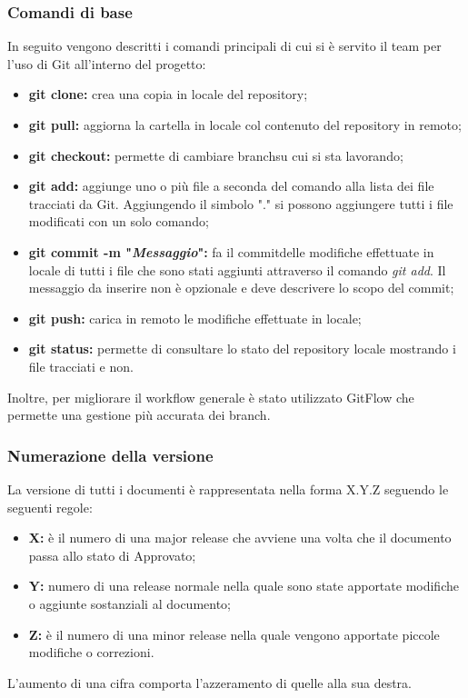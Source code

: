 		\subsubsection{Comandi di base}
			In seguito vengono descritti i comandi principali di cui si è servito il team per l'uso di Git all'interno del progetto:
			\begin{itemize}
				\item \textbf{git clone:} crea una copia in locale del repository\pedice;
				\item \textbf{git pull:} aggiorna la cartella in locale col contenuto del repository in remoto;
				\item \textbf{git checkout:} permette di cambiare branch\pedice su cui si sta lavorando;
				\item \textbf{git add:} aggiunge uno o più file a seconda del comando alla lista dei file tracciati da Git. Aggiungendo il simbolo "." si possono aggiungere tutti i file modificati con un solo comando;
				\item \textbf{git commit -m "\textit{Messaggio}":} fa il commit\pedice delle modifiche effettuate in locale di tutti i file che sono stati aggiunti attraverso il comando \textit{git add}. Il messaggio da inserire non è opzionale e deve descrivere lo scopo del commit;
				\item \textbf{git push:} carica in remoto le modifiche effettuate in locale;
				\item \textbf{git status:} permette di consultare  lo stato del repository locale mostrando i file tracciati e non. \newline
			\end{itemize}
			Inoltre, per migliorare il workflow generale è stato utilizzato GitFlow che permette una gestione più accurata dei branch.
		\subsubsection{Numerazione della versione}
		\label{3.2.2}
			La versione di tutti i documenti è rappresentata nella forma X.Y.Z seguendo le seguenti regole:
			\begin{itemize}
				\item \textbf{X:} è il numero di una major release che avviene una volta che il documento passa allo stato di Approvato;
				\item \textbf{Y:} numero di una release normale nella quale sono state apportate modifiche o aggiunte sostanziali al documento;
				\item \textbf{Z:} è il numero di una minor release nella quale vengono apportate piccole modifiche o correzioni.
			\end{itemize}
		L'aumento di una cifra comporta l'azzeramento di quelle alla sua destra. \newline
